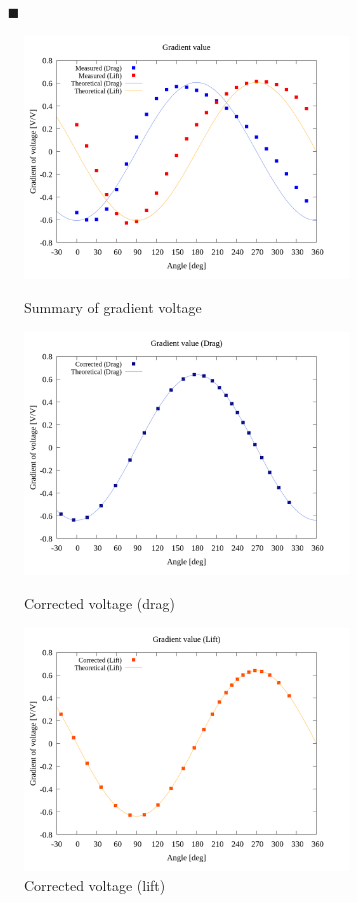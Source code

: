 \documentclass[twocolumn,a4j]{jsarticle}
\begin{document}
\newpage

\begin{itemize}
    \item [$\blacksquare$] 
\end{itemize}

\begin{figure}[htbp]
    \footnotesize
    \begin{center}
        \includegraphics[width=86mm]{../graphes/offset_x=10_y=5/20/20_adjust-value.png}
        \caption{Summary of gradient voltage}
        \includegraphics[width=86mm]{../graphes/offset_x=10_y=5/21/21-2_corrected_offset_drag.png}
        \caption{Corrected voltage (drag)}
        \includegraphics[width=86mm]{../graphes/offset_x=10_y=5/21/21-2_corrected_offset_lift.png}
        \caption{Corrected voltage (lift)}
    \end{center}
\end{figure}
\end{document}
